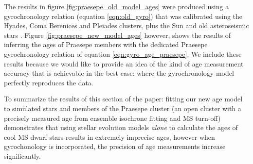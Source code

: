 The results in figure \ref{fig:praesepe_old_model_ages} were produced using a
gyrochronology relation (equation \ref{eqn:old_gyro}) that was calibrated
using the Hyades, Coma Berenices and Pleiades clusters, plus the Sun and old
asteroseismic stars \citep{angus2015}.
Figure \ref{fig:praesepe_new_model_ages} however, shows the results of
inferring the ages of Praesepe members with the dedicated Praesepe
gyrochronology relation of equation \ref{eqn:gyro_age_praesepe}.
We include these results because we would like to provide an idea of the kind
of age measurement accuracy that is achievable in the best case: where the
gyrochronology model perfectly reproduces the data.

To summarize the results of this section of the paper: fitting our new age
model to simulated stars and members of the Praesepe cluster (an open cluster
with a precisely measured age from ensemble isochrone fitting and MS turn-off)
demonstrates that using stellar evolution models {\it alone} to calculate the
ages of cool MS dwarf stars results in extremely imprecise ages, however when
gyrochonology is incorporated, the precision of age measurements increase
significantly.
